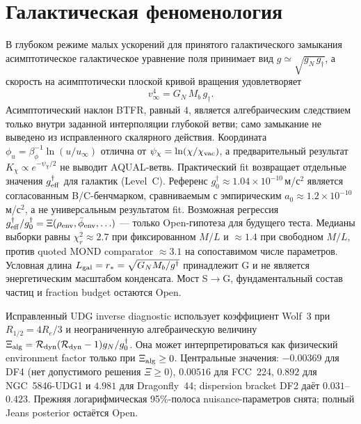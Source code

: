 \documentclass[11pt,a4paper]{article}
\begin{document}
\section{Галактическая феноменология}
\label{sec:galactic}

В глубоком режиме малых ускорений для принятого галактического замыкания
асимптотическое галактическое уравнение поля принимает вид
$g\simeq\sqrt{g_N\,g_\dagger}$, а скорость на асимптотически
плоской кривой вращения удовлетворяет
\begin{equation}
  \label{eq:btfr}
  v_\infty^4 = G_N\,M_b\,g_\dagger.
\end{equation}
Асимптотический наклон BTFR, равный $4$, является алгебраическим
следствием только внутри заданной интерполяции глубокой ветви; само
замыкание не выведено из исправленного скалярного действия.  Координата
$\phi_u=\beta_\phi^{-1}\ln(u/u_\infty)$ отлична от
$\psi_\chi=\ln(\chi/\chi_{\rm vac})$, а предварительный результат
$K_\chi\propto e^{-\psi_\chi/2}$ не выводит AQUAL-ветвь.
Практический fit возвращает отдельные значения $g^\dagger_{\rm eff}$ для галактик (Level~C).  Референс $g^\dagger_0\approx1.04\times10^{-10}$\,м/с$^2$ является согласованным B/C-бенчмарком, сравниваемым с эмпирическим $a_0\approx1.2\times10^{-10}$\,м/с$^2$, а не универсальным результатом fit.  Возможная регрессия $g^\dagger_{\rm eff}/g^\dagger_0=\Xi(\rho_{\rm env},\bar\phi_{\rm env},\ldots)$ — только Open-гипотеза для будущего теста.  Медианы выборки равны $\chi_r^2\approx2.7$ при фиксированном $M/L$ и $\approx1.4$ при свободном $M/L$, против quoted MOND comparator $\approx3.1$ на сопоставимом числе параметров.  Условная длина $L_{\rm gal}=r_*=\sqrt{G_NM_b/g^\dagger}$ принадлежит G и не является энергетическим масштабом конденсата. Мост S$\to$G, фундаментальный состав частиц и fraction budget остаются Open.

Исправленный UDG inverse diagnostic использует коэффициент Wolf~3 при
$R_{1/2}=4R_e/3$ и неограниченную алгебраическую величину
$\Xi_{\rm alg}=\mathcal R_{\rm dyn}(\mathcal R_{\rm dyn}-1)g_N/g^\dagger_0$.
Она может интерпретироваться как физический environment factor только при
$\Xi_{\rm alg}\ge0$. Центральные значения: $-0.00369$ для DF4 (нет
допустимого решения $\Xi\ge0$), $0.00516$ для FCC~224, $0.892$ для
NGC~5846-UDG1 и $4.981$ для Dragonfly~44; dispersion bracket DF2 даёт
$0.031$--$0.423$. Прежняя логарифмическая 95\%-полоса nuisance-параметров
снята; полный Jeans posterior остаётся Open.
\end{document}
